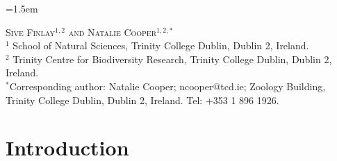 \documentclass[12pt,a4paper]{article}
\begin{document}
\parindent=1.5em		
\addtolength{\parskip}{.3em} 
\doublespace



\noindent
\textsc{Sive Finlay$^{1,2}$ and Natalie Cooper$^{1,2,*}$}\\

\noindent
$^1$ School of Natural Sciences, Trinity College Dublin, Dublin 2, Ireland.\\ 
\noindent
$^2$ Trinity Centre for Biodiversity Research, Trinity College Dublin, Dublin 2, Ireland.\\
\noindent
$^*$Corresponding author: Natalie Cooper; ncooper@tcd.ie; Zoology Building, Trinity College Dublin, Dublin 2, Ireland. Tel: +353 1 896 1926.\\


	
	

\newpage
\section{Introduction}
\end{document}
